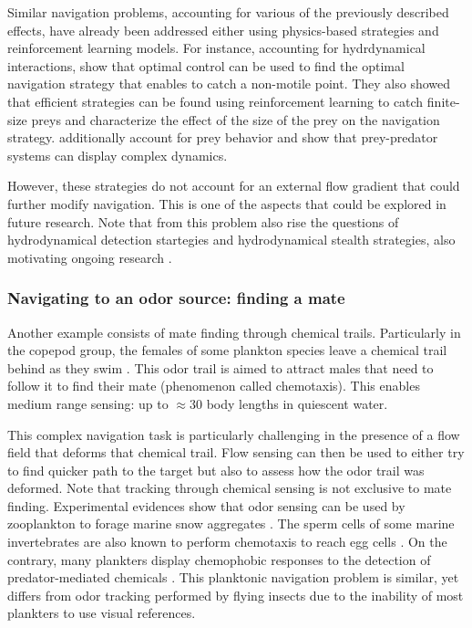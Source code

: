 Similar navigation problems, accounting for various of the previously described effects, have already been addressed either using physics-based strategies and reinforcement learning models.
For instance, accounting for hydrdynamical interactions, \citet{zhu2022optimising} show that optimal control can be used to find the optimal navigation strategy that enables to catch a non-motile point. 
They also showed that efficient strategies can be found using reinforcement learning to catch finite-size preys and characterize the effect of the size of the prey on the navigation strategy.
\citet{borra2022reinforcement} additionally account for prey behavior and show that prey-predator systems can display complex dynamics.

However, these strategies do not account for an external flow gradient that could further modify navigation.
This is one of the aspects that could be explored in future research.
Note that from this problem also rise the questions of hydrodynamical detection startegies and hydrodynamical stealth strategies, also motivating ongoing research \citep{ren2021bluff}.

\subsubsection{Navigating to an odor source: finding a mate}

Another example consists of mate finding through chemical trails.
Particularly in the copepod group, the females of some plankton species leave a chemical trail behind as they swim \citep{weissburg1998following, bagoien2005blind, yen2010chemical}.
This odor trail is aimed to attract males that need to follow it to find their mate (phenomenon called chemotaxis).
This enables medium range sensing: up to $\approx 30$ body lengths \citep{bagoien2005blind} in quiescent water.

This complex navigation task is particularly challenging in the presence of a flow field that deforms that chemical trail.
Flow sensing can then be used to either try to find quicker path to the target but also to assess how the odor trail was deformed.
Note that tracking through chemical sensing is not exclusive to mate finding.
Experimental evidences show that odor sensing can be used by zooplankton to forage marine snow aggregates \citep{lombard2013copepods}.
The sperm cells of some marine invertebrates are also known to perform chemotaxis to reach egg cells \citep{lange2021sperm}.
On the contrary, many plankters display chemophobic responses to the detection of predator-mediated chemicals \citep{hay2009marine}.
This planktonic  navigation problem is similar, yet differs from odor tracking performed by flying insects \citep{carde2008navigational, willis2011role} due to the inability of most plankters to use visual references.

